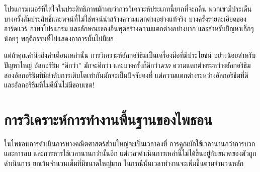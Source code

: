 
โปรแกรมเมอร์ที่ใส่ใจในประสิทธิภาพมักพบว่าการวิเคราะห์ประเภทนี้ยากที่จะกลืน พวกเขามีประเด็น 
บางครั้งสัมประสิทธิ์และพจน์ที่ไม่ใช่พจน์นำสร้างความแตกต่างอย่างแท้จริง 
บางครั้งรายละเอียดของฮาร์ดแวร์ ภาษาโปรแกรม และลักษณะของอินพุตสร้างความแตกต่างอย่างมาก 
และสำหรับปัญหาเล็กๆ น้อยๆ พฤติกรรมที่ไม่แสดงอาการนั้นไม่มีผล



แต่ถ้าคุณคำนึงถึงคำเตือนเหล่านั้น การวิเคราะห์อัลกอริธึมเป็นเครื่องมือที่มีประโยชน์ อย่างน้อยสำหรับปัญหาใหญ่ 
อัลกอริธึม ``ดีกว่า'' มักจะดีกว่า และบางครั้งก็ดีกว่า{\em มาก} ความแตกต่างระหว่างอัลกอริธึมสองอัลกอริธึมที่มีลำดับการเติบโตเท่ากันมักจะเป็นปัจจัยคงที่ 
แต่ความแตกต่างระหว่างอัลกอริธึมที่ดีและอัลกอริธึมที่ไม่ดีนั้นไม่มีขอบเขต!


\section{การวิเคราะห์การทำงานพื้นฐานของไพธอน} %


ในไพธอนการดำเนินการทางคณิตศาสตร์ส่วนใหญ่จะเป็นเวลาคงที่ การคูณมักใช้เวลานานกว่าการบวกและการลบ 
และการหารใช้เวลานานกว่านั้นอีก แต่เวลาดำเนินการเหล่านี้ไม่ได้ขึ้นอยู่กับขนาดของตัวถูกดำเนินการ 
ยกเว้นจำนวนเต็มที่มีขนาดใหญ่มาก ในกรณีนั้นเวลาทำงานจะเพิ่มขึ้นตามจำนวนหลัก 



